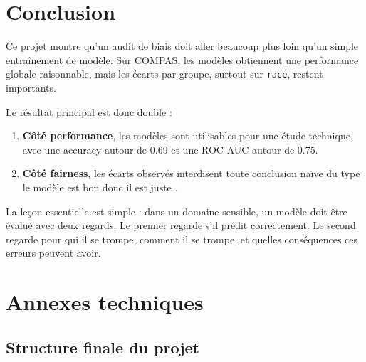 \documentclass[12pt,a4paper]{report}
\begin{document}
\chapter{Conclusion}

Ce projet montre qu'un audit de biais doit aller beaucoup plus loin qu'un simple entraînement de modèle. Sur COMPAS, les modèles obtiennent une performance globale raisonnable, mais les écarts par groupe, surtout sur \texttt{race}, restent importants.

Le résultat principal est donc double :

\begin{enumerate}
  \item \textbf{Côté performance}, les modèles sont utilisables pour une étude technique, avec une accuracy autour de 0.69 et une ROC-AUC autour de 0.75.
  \item \textbf{Côté fairness}, les écarts observés interdisent toute conclusion naïve du type \og le modèle est bon donc il est juste \fg{}.
\end{enumerate}

\begin{tcolorbox}[summarybox]
\large
La leçon essentielle est simple : dans un domaine sensible, un modèle doit être évalué avec deux regards. Le premier regarde s'il prédit correctement. Le second regarde pour qui il se trompe, comment il se trompe, et quelles conséquences ces erreurs peuvent avoir.
\end{tcolorbox}

\appendix
\chapter{Annexes techniques}

\section{Structure finale du projet}
\end{document}
